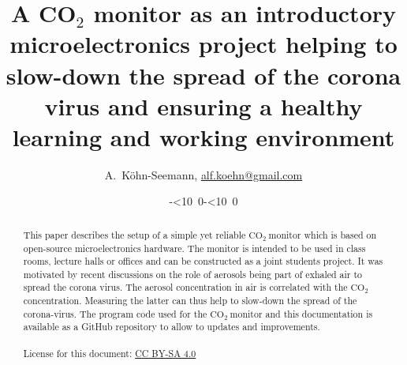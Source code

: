 \documentclass[12pt,a4paper]{article}
\def\myisodate{\leavevmode\hbox{\the\year-\twodigits\month-\twodigits\day}}
\def\twodigits#1{\ifnum#1<10 0\fi\the#1}
\newcommand{\coo}{\ensuremath{\mathrm{CO_2}~}}
\begin{document}
\title{A CO$_2$ monitor as an introductory microelectronics project helping to slow-down the spread of the corona virus and ensuring a healthy learning and working environment}

\author{A.~K\"{o}hn-Seemann, \href{mailto:alf.koehn@gmail.com}{alf.koehn@gmail.com}%
		}
		
\date{\myisodate}


\maketitle

\begin{abstract}
This paper describes the setup of a simple yet reliable \coo monitor which is based on open-source microelectronics hardware. The monitor is intended to be used in class rooms, lecture halls or offices and can be constructed as a joint students project. It was motivated by recent discussions on the role of aerosols being part of exhaled air to spread the corona virus. The aerosol concentration in air is correlated with the \coo concentration. Measuring the latter can thus help to slow-down the spread of the corona-virus. The program code used for the \coo monitor and this documentation is available as a GitHub repository to allow to updates and improvements. 
\\ \quad \\ License for this document: \href{https://creativecommons.org/licenses/by-sa/4.0/}{CC BY-SA 4.0}
\end{abstract}


\end{document}
